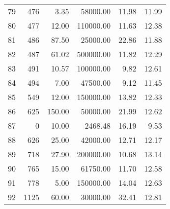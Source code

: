 \begin{tabular}{rrrrrr}
    79 &    476 &   3.35 &  58000.00 &  11.98 & 11.99 \\
    80 &    477 &  12.00 & 110000.00 &  11.63 & 12.38 \\
    81 &    486 &  87.50 &  25000.00 &  22.86 & 11.88 \\
    82 &    487 &  61.02 & 500000.00 &  11.82 & 12.29 \\
    83 &    491 &  10.57 & 100000.00 &   9.82 & 12.61 \\
    84 &    494 &   7.00 &  47500.00 &   9.12 & 11.45 \\
    85 &    549 &  12.00 & 150000.00 &  13.82 & 12.33 \\
    86 &    625 & 150.00 &  50000.00 &  21.99 & 12.62 \\
    87 &      0 &  10.00 &   2468.48 &  16.19 &  9.53 \\
    88 &    626 &  25.00 &  42000.00 &  12.71 & 12.17 \\
    89 &    718 &  27.90 & 200000.00 &  10.68 & 13.14 \\
    90 &    765 &  15.00 &  61750.00 &  11.70 & 12.58 \\
    91 &    778 &   5.00 & 150000.00 &  14.04 & 12.63 \\
    92 &   1125 &  60.00 &  30000.00 &  32.41 & 12.81 \\
\bottomrule
\end{tabular}
